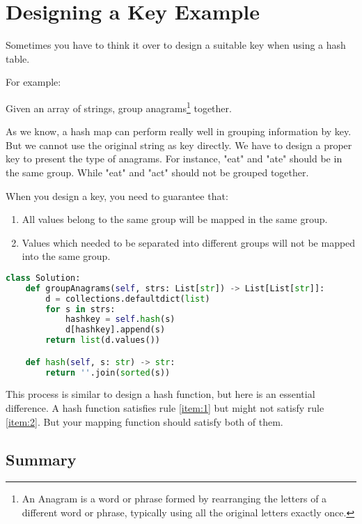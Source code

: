 \section{Designing a Key Example}

Sometimes you have to think it over to design a suitable key when using a hash table.


For example:


Given an array of strings, group anagrams\footnote{An Anagram is a word or phrase formed by rearranging the letters of a different word or phrase, typically using all the original letters exactly once.} together.  




As we know, a hash map can perform really well in grouping information by key.
But we cannot use the original string as key directly.
We have to design a proper key to present the type of anagrams.
For instance,  "eat" and "ate" should be in the same group.
While "eat" and "act" should not be grouped together.


When you design a key, you need to guarantee that:
\begin{enumerate}
\item All values belong to the same group will be mapped in the same group.\label{item:1}
\item Values which needed to be separated into different groups will not be mapped into the same group.\label{item:2}
\end{enumerate}


\begin{lstlisting}[language=python]
class Solution:
    def groupAnagrams(self, strs: List[str]) -> List[List[str]]:
        d = collections.defaultdict(list)
        for s in strs:
            hashkey = self.hash(s)
            d[hashkey].append(s)
        return list(d.values())

    def hash(self, s: str) -> str:
        return ''.join(sorted(s))        
\end{lstlisting}

This process is similar to design a hash function, but here is an essential difference.
A hash function satisfies rule \ref{item:1} but might not satisfy rule \ref{item:2}.
But your mapping function should satisfy both of them.






\subsection{Summary}

